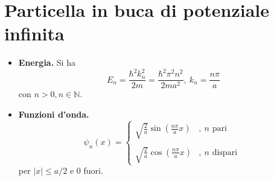\documentclass[11pt, a4paper]{scrartcl} %
\numberwithin{equation}{section}
\theoremstyle{style2}
\theoremstyle{style1}
\begin{document}
\section{Particella in buca di potenziale infinita}
\begin{multicols}{2}
	\begin{itemize}
		\item {\sffamily \bfseries Energia.} 
			Si ha 
			\begin{equation}
				E_n = \frac{\hbar ^2 k_n^2}{2m} = \frac{\hbar ^2 \pi ^2 n ^2}{2ma^2}, \ k_n = \frac{n\pi }{a}
			\end{equation}
			con $n > 0 , n \in \mathbb{N}$.
			\item {\sffamily \bfseries Funzioni d'onda.} 
				\begin{equation}
					\psi _n(x) = \begin{cases}
						\displaystyle \sqrt{\frac{2}{a}} \sin \left(\frac{n\pi }{a}x\right) &,\ n \text{ pari }\\
						\\
						\displaystyle \sqrt{\frac{2}{a}} \cos \left(\frac{n\pi}{a}x\right) &,\ n \text{ dispari }
					\end{cases}
				\end{equation}
				per $\lvert x \rvert \le a /2 $ e $0$ fuori. 
	\end{itemize}
\end{multicols}
\end{document}
